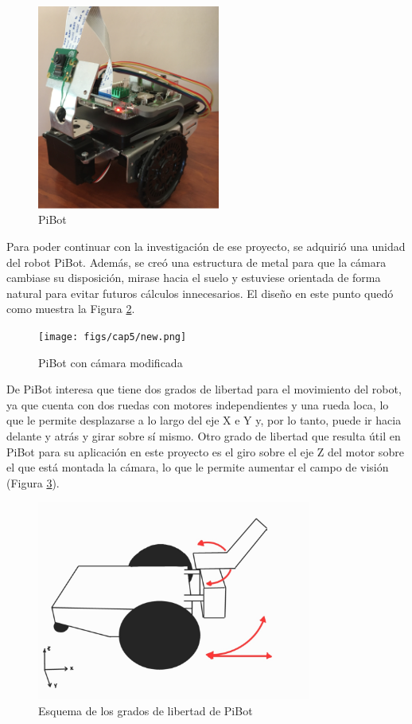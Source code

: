 \begin{figure} [h!]
	\begin{center}
		\includegraphics[width=6cm]{figs/cap5/Original.png}
	\end{center}
	\caption{PiBot} 
	\label{fig:pibot}
\end{figure}

Para poder continuar con la investigación de ese proyecto, se adquirió una unidad del robot PiBot. Además, se creó una estructura de metal para que la cámara cambiase su disposición, mirase hacia el suelo y estuviese orientada de forma natural para evitar futuros cálculos innecesarios. El diseño en este punto quedó como muestra la Figura \ref{fig:pibotmetal}.


\begin{figure} [h!]
	\begin{center}
		\texttt{[image: figs/cap5/new.png]}
	\end{center}
	\caption{PiBot con cámara modificada} 
	\label{fig:pibotmetal}
\end{figure}


De PiBot interesa que tiene dos grados de libertad para el movimiento del robot, ya que cuenta con dos ruedas con motores independientes y una rueda loca, lo que le permite desplazarse a lo largo del eje X e Y y, por lo tanto, puede ir hacia delante y atrás y girar sobre sí mismo. Otro grado de libertad que resulta útil en PiBot para su aplicación en este proyecto es el giro sobre el eje Z del motor sobre el que está montada la cámara, lo que le permite aumentar el campo de visión (Figura \ref{fig:esquemaDOF}).


\begin{figure} [h!]
	\begin{center}
		\includegraphics[width=9cm]{figs/cap5/dof.jpg}
	\end{center}
	\caption{Esquema de los grados de libertad de PiBot} 
	\label{fig:esquemaDOF}
\end{figure}


